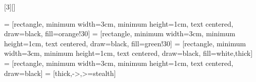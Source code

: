 \renewcommand{\thefigure}{\arabic{figure}}

\usepackage{tabularray}           %

[3][]{
}

\usepackage{tikz}      %
\usepackage{float}     %
\usepackage{bytefield} %

\usetikzlibrary{shapes.geometric, arrows, positioning, decorations.pathreplacing, calc}
 = [rectangle, minimum width=3cm, minimum height=1cm, text centered, draw=black, fill=orange!30]
 = [rectangle, minimum width=3cm, minimum height=1cm, text centered, draw=black, fill=green!30]
 = [rectangle, minimum width=3cm, minimum height=1cm, text centered, draw=black, fill=white,thick]
 = [rectangle, minimum width=3cm, minimum height=1cm, text centered, draw=black]
 = [thick,->,>=stealth]


\newcommand{\tikzfigure}[3]{%
  \vspace{\baselineskip}%
  \begin{figure}[H]%
    \centering%
    \caption{#2}%
    \label{fig:#3}%
  \end{figure}%
}

